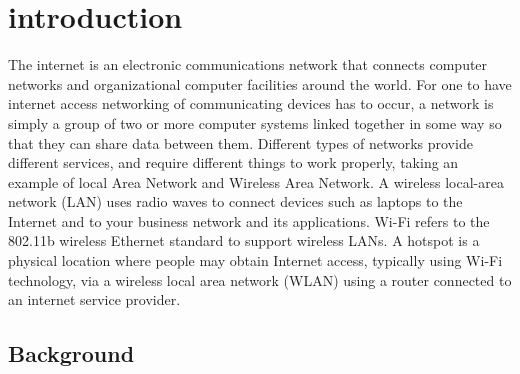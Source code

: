 ﻿\documentclass[10]{article}
\begin{document}
\section{introduction}

The internet is an electronic communications network that connects computer networks and organizational computer facilities around the world. For one to have internet access networking of communicating devices has to occur,  a network is simply a group of two or more computer systems linked together in some way so that they can share data between them. Different types of networks provide different services, and require different things to work properly, taking an example of local Area Network and Wireless Area Network.
A wireless local-area network (LAN) uses radio waves to connect devices such as laptops to the Internet and to your business network and its applications.
Wi-Fi refers to the 802.11b wireless Ethernet standard to support wireless LANs.
A hotspot is a physical location where people may obtain Internet access, typically using Wi-Fi technology, via a wireless local area network (WLAN) using a router connected to an internet service provider.

\subsection{Background}
\end{document}
